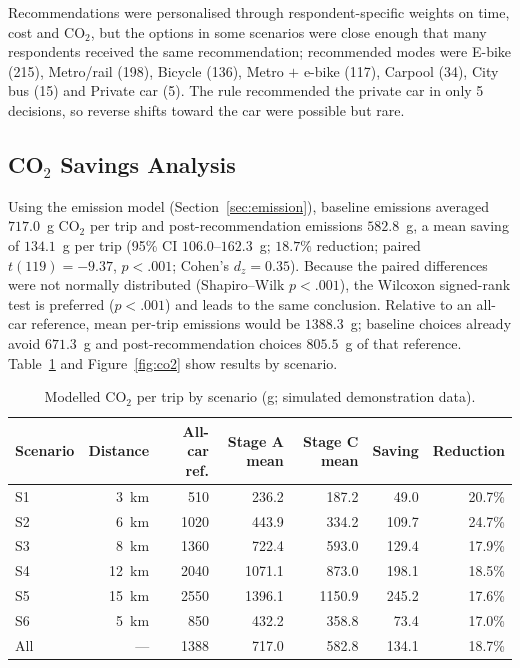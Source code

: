 \documentclass[11pt,a4paper]{article}
\begin{document}
Recommendations were personalised through respondent-specific weights on time, cost and CO$_2$, but
the options in some scenarios were close enough that many respondents received the same
recommendation; recommended modes were E-bike (215), Metro/rail (198), Bicycle (136), Metro $+$ e-bike
(117), Carpool (34), City bus (15) and Private car (5). The rule recommended the private car in only 5
decisions, so reverse shifts toward the car were possible but rare.

\subsection{CO$_2$ Savings Analysis}
Using the emission model (Section~\ref{sec:emission}), baseline emissions averaged $717.0$~g CO$_2$ per
trip and post-recommendation emissions $582.8$~g, a mean saving of $134.1$~g per trip (95\% CI
$106.0$--$162.3$~g; $18.7\%$ reduction; paired $t(119) = -9.37$, $p < .001$; Cohen's $d_z = 0.35$).
Because the paired differences were not normally distributed (Shapiro--Wilk $p < .001$), the Wilcoxon
signed-rank test is preferred ($p < .001$) and leads to the same conclusion. Relative to an all-car
reference, mean per-trip emissions would be $1388.3$~g; baseline choices already avoid $671.3$~g and
post-recommendation choices $805.5$~g of that reference. Table~\ref{tab:co2} and Figure~\ref{fig:co2}
show results by scenario.

\begin{table}[H]
\centering
\small
\caption{Modelled CO$_2$ per trip by scenario (g; simulated demonstration data).}
\label{tab:co2}
\begin{tabular}{@{}lrrrrrr@{}}
\toprule
\textbf{Scenario} & \textbf{Distance} & \textbf{All-car ref.} & \textbf{Stage A mean} & \textbf{Stage C mean} & \textbf{Saving} & \textbf{Reduction}\\
\midrule
S1 & 3~km & 510 & 236.2 & 187.2 & 49.0 & 20.7\%\\
S2 & 6~km & 1020 & 443.9 & 334.2 & 109.7 & 24.7\%\\
S3 & 8~km & 1360 & 722.4 & 593.0 & 129.4 & 17.9\%\\
S4 & 12~km & 2040 & 1071.1 & 873.0 & 198.1 & 18.5\%\\
S5 & 15~km & 2550 & 1396.1 & 1150.9 & 245.2 & 17.6\%\\
S6 & 5~km & 850 & 432.2 & 358.8 & 73.4 & 17.0\%\\
All & --- & 1388 & 717.0 & 582.8 & 134.1 & 18.7\%\\
\bottomrule
\end{tabular}
\end{table}
\end{document}
